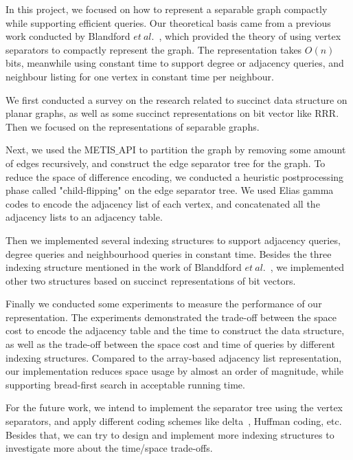 \documentclass[12pt,glossary]{dalthesis}
\begin{document}
In this project, we focused on how to represent a separable graph compactly while supporting efficient queries. Our theoretical basis came from a previous work conducted by Blandford $et \ al.$~\cite{compact-representation}, which provided the theory of using vertex separators to compactly represent the graph. The representation takes $O(n)$ bits, meanwhile using constant time to support degree or adjacency queries, and neighbour listing for one vertex in constant time per neighbour. 

\bigskip
\bigskip

We first conducted a survey on the research related to succinct data structure on planar graphs, as well as some succinct representations on bit vector like RRR. Then we focused on the representations of separable graphs. 

\bigskip
\bigskip

Next, we used the METIS$\_$API to partition the graph by removing some amount of edges recursively, and construct the edge separator tree for the graph. To reduce the space of difference encoding, we conducted a heuristic postprocessing phase called "child-flipping" on the edge separator tree. We used Elias gamma codes to encode the adjacency list of each vertex, and concatenated all the adjacency lists to an adjacency table.

\bigskip
\bigskip

Then we implemented several indexing structures to support adjacency queries, degree queries and neighbourhood queries in constant time. Besides the three indexing structure mentioned in the work of Blanddford $et \ al.$~\cite{compact-representation}, we implemented other two structures based on succinct representations of bit vectors.

\bigskip
\bigskip

Finally we conducted some experiments to measure the performance of our representation. The experiments demonstrated the trade-off between the space cost to encode the adjacency table and the time to construct the data structure, as well as the trade-off between the space cost and time of queries by different indexing structures. Compared to the array-based adjacency list representation, our implementation reduces space usage by almost an order of magnitude, while supporting bread-first search in acceptable running time.

\bigskip
\bigskip

For the future work, we intend to implement the separator tree using the vertex separators, and apply different coding schemes like delta~\cite{Elias}, Huffman coding, etc. Besides that, we can try to design and implement more indexing structures to investigate more about the time/space trade-offs.
 


\end{document}
